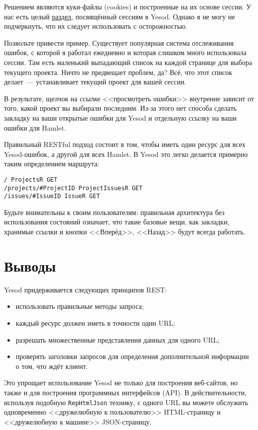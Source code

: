 Решением являются куки-файлы (cookies) и построенные на их основе сессии. У нас есть
целый
\hyperref[chap:sessions]{раздел}, посвящённый сессиям в Yesod. Однако я не могу не
подчеркнуть, что их следует использовать с осторожностью.

Позвольте привести пример. Существует популярная система отслеживания ошибок, с которой я
работал ежедневно и которая слишком много использовала сессии. Там есть маленький
выпадающий список на каждой странице для выбора текущего проекта. Ничто не предвещает
проблем, да? Всё, что этот список делает~--- устанавливает текущий проект для вашей
сессии.

В результате, щелчок на ссылке <<просмотреть ошибки>> внутренне зависит от того, какой
проект вы выбирали последним. Из-за этого нет способа сделать закладку на ваши открытые
ошибки для Yesod и отдельную ссылку на ваши ошибки для Hamlet.

Правильный RESTful подход состоит в том, чтобы иметь один ресурс для всех Yesod-ошибок,
а другой для всех Hamlet. В Yesod это легко делается примерно таким
определением маршрута:
\begin{lstlisting}
/ ProjectsR GET
/projects/#ProjectID ProjectIssuesR GET
/issues/#IssueID IssueR GET
\end{lstlisting}

Будьте внимательны к своим пользователям: правильная архитектура без использования состояний означает, что такие базовые вещи, как закладки, хранимые ссылки и кнопки <<Вперёд>>, <<Назад>> будут всегда работать.

\section{Выводы}

Yesod придерживается следующих принципов REST:
\begin{itemize}
 \item использовать правильные методы запроса;
 \item каждый ресурс должен иметь в точности один URL;
 \item разрешать множественные представления данных для одного URL;
 \item проверять заголовки запросов для определения дополнительной информации о том, что
ждёт клиент.
\end{itemize}

Это упрощает использование Yesod не только для построения веб-сайтов, но также и для
построения программных интерфейсов (API). В действительности, используя подобную
\verb*|RepHtmlJson| технику, с одного URL вы можете обслужить одновременно <<дружелюбную к
пользователю>> HTML-страницу и <<дружелюбную к машине>> JSON-страницу.
